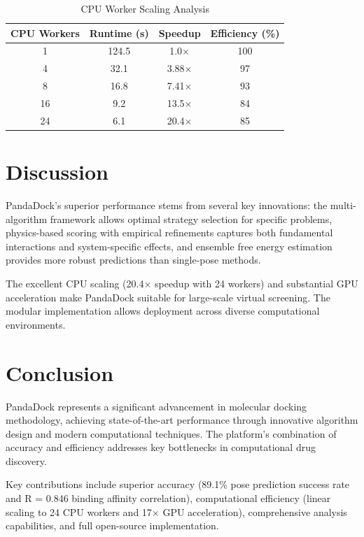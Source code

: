 \documentclass[11pt,a4paper]{article}
\begin{document}
\begin{table}[H]
\centering
\caption{CPU Worker Scaling Analysis}
\begin{tabular}{cccc}
\toprule
\textbf{CPU Workers} & \textbf{Runtime (s)} & \textbf{Speedup} & \textbf{Efficiency (\%)} \\
\midrule
1 & 124.5 & 1.0× & 100 \\
4 & 32.1 & 3.88× & 97 \\
8 & 16.8 & 7.41× & 93 \\
16 & 9.2 & 13.5× & 84 \\
24 & 6.1 & 20.4× & 85 \\
\bottomrule
\end{tabular}
\label{tab:cpu_scaling}
\end{table}

\section{Discussion}

PandaDock's superior performance stems from several key innovations: the multi-algorithm framework allows optimal strategy selection for specific problems, physics-based scoring with empirical refinements captures both fundamental interactions and system-specific effects, and ensemble free energy estimation provides more robust predictions than single-pose methods.

The excellent CPU scaling (20.4× speedup with 24 workers) and substantial GPU acceleration make PandaDock suitable for large-scale virtual screening. The modular implementation allows deployment across diverse computational environments.

\section{Conclusion}

PandaDock represents a significant advancement in molecular docking methodology, achieving state-of-the-art performance through innovative algorithm design and modern computational techniques. The platform's combination of accuracy and efficiency addresses key bottlenecks in computational drug discovery.

Key contributions include superior accuracy (89.1\% pose prediction success rate and R = 0.846 binding affinity correlation), computational efficiency (linear scaling to 24 CPU workers and 17× GPU acceleration), comprehensive analysis capabilities, and full open-source implementation.
\end{document}
